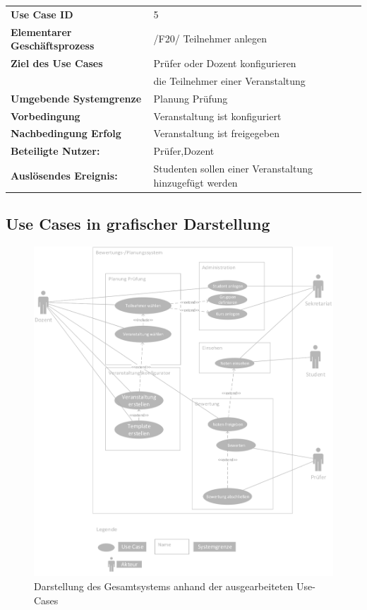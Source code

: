			\begin{table}[ht!]
			\begin{tabular}{ll}
			 \textbf{Use Case ID} & 5 \\
		 	 \textbf{Elementarer Geschäftsprozess} & /F20/ Teilnehmer anlegen \\ 
			 \textbf{Ziel des Use Cases} & Prüfer oder Dozent konfigurieren \\& die Teilnehmer einer Veranstaltung  \\
			 \textbf{Umgebende Systemgrenze} & Planung Prüfung \\ 
			 \textbf{Vorbedingung} & Veranstaltung ist konfiguriert \\
			 \textbf{Nachbedingung Erfolg} & Veranstaltung ist freigegeben\\
			 			    
			 \textbf{Beteiligte Nutzer:} & Prüfer,Dozent \\ 
		     \textbf{Auslösendes Ereignis:} & Studenten sollen einer Veranstaltung hinzugefügt werden\\ 
			 
			\end{tabular} 
			\label{tab:usecase_5}
			\end{table}

						
		\clearpage
		\subsection{Use Cases in grafischer Darstellung}
		
	\begin{figure}[th!]
	\centering
	\includegraphics[width=\textwidth]{./img/use_case}
	\caption{Darstellung des Gesamtsystems anhand der ausgearbeiteten Use-Cases}
	\label{fig:use_case}
	\end{figure}
	

